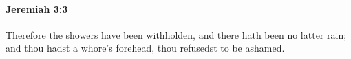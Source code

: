 
		\paragraph{Jeremiah 3:3} %
			\label{JEREMIAH-3-3}

			Therefore the showers have been withholden, and there hath been no latter rain; and thou hadst a whore’s forehead, thou refusedst to be ashamed.


